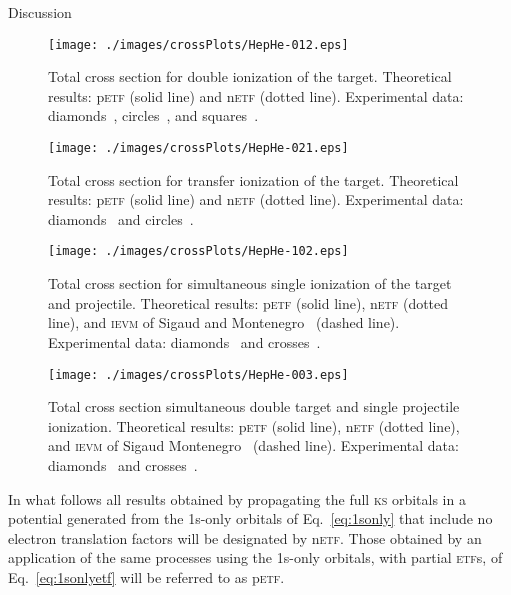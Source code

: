 \documentclass[aps, pra, reprint, groupedaddress, amsfonts, longbibliography,
               amsmath, amssymb, showpacs, nofootinbib]{revtex4-1}
\begin{document}
\begin{section}{Discussion \label{sec:disc}}
   \begin{figure}[t]
      \centering
      \texttt{[image: ./images/crossPlots/HepHe-012.eps]}
      \caption{Total cross section for double ionization of the target.
               Theoretical results: p\textsc{etf} (solid line) and n\textsc{etf} (dotted line).
               Experimental data: diamonds~\cite{Dub-89}, circles~\cite{FTFHLP-95}, and
                                  squares~\cite{DT-88}. \label{fig:cs012}}
   \end{figure}

   \begin{figure}[t]
      \centering
      \texttt{[image: ./images/crossPlots/HepHe-021.eps]}
      \caption{Total cross section for transfer ionization of the target.
               Theoretical results: p\textsc{etf} (solid line) and n\textsc{etf} (dotted line).
               Experimental data: diamonds~\cite{Dub-89} and circles~\cite{FTFHLP-95}.
               \label{fig:cs021}}
   \end{figure}
   \begin{figure}[t]
      \centering
      \texttt{[image: ./images/crossPlots/HepHe-102.eps]}
      \caption{Total cross section for simultaneous single ionization of the target and projectile.
               Theoretical results: p\textsc{etf} (solid line), n\textsc{etf} (dotted line), and
                            \textsc{ievm} of Sigaud and Montenegro~\cite{SM-03} (dashed line).
               Experimental data: diamonds~\cite{Dub-89} and crosses~\cite{SSMSM-11}. \label{fig:cs102}}
   \end{figure}

   \begin{figure}[t]
      \centering
      \texttt{[image: ./images/crossPlots/HepHe-003.eps]}
      \caption{Total cross section simultaneous double target and single projectile ionization.
               Theoretical results: p\textsc{etf} (solid line), n\textsc{etf} (dotted line), and
                                    \textsc{ievm} of Sigaud Montenegro~\cite{SM-03} (dashed line).
               Experimental data: diamonds~\cite{Dub-89} and crosses~\cite{SSMSM-11}. \label{fig:cs003}}
   \end{figure}

   In what follows all results obtained by propagating the full \textsc{ks} orbitals in a potential
   generated from the 1s-only orbitals of Eq.~\eqref{eq:1sonly} that include no electron translation
   factors will be designated by n\textsc{etf}. Those obtained by an application of the same processes
   using the 1s-only orbitals, with partial \textsc{etf}s, of Eq.~\eqref{eq:1sonlyetf} will be referred
   to as p\textsc{etf}.


\end{section}
\end{document}
